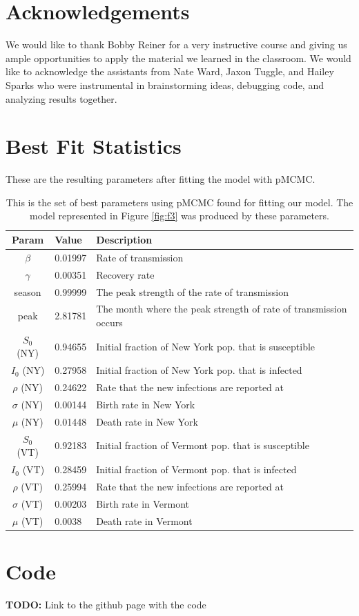 \documentclass[11pt]{amsart}
\begin{document}
\section*{Acknowledgements}
We would like to thank Bobby Reiner for a very instructive course and giving us ample opportunities to apply the material we learned in the classroom.
We would like to acknowledge the assistants from Nate Ward, Jaxon Tuggle, and Hailey Sparks who were instrumental in brainstorming ideas, debugging code, and analyzing results together.

\newpage
\appendix

\section{Best Fit Statistics}
These are the resulting parameters after fitting the model with pMCMC.
\begin{table}[h]
    \centering
    \begin{tabular}{|c|l|l|} %
        \hline
        \textbf{Param} & \textbf{Value} & \textbf{Description} \\ 
        \hline
        $\beta$ & 0.01997 & Rate of transmission \\
        \hline
        $\gamma$ & 0.00351 & Recovery rate \\
	\hline
        season & 0.99999 & The peak strength of the rate of transmission \\
        \hline
        peak & 2.81781 & The month where the peak strength of rate of transmission occurs \\
        \hline
        $S_0$ (NY) & 0.94655 & Initial fraction of New York pop. that is susceptible \\
        \hline
        $I_0$ (NY) & 0.27958 & Initial fraction of New York pop. that is infected \\
        \hline
        $\rho$ (NY) & 0.24622 & Rate that the new infections are reported at \\
        \hline
        $\sigma$ (NY) & 0.00144 & Birth rate in New York \\
        \hline
        $\mu$ (NY) & 0.01448 & Death rate in New York \\
        \hline
        $S_0$ (VT) & 0.92183 & Initial fraction of Vermont pop. that is susceptible \\
        \hline
        $I_0$ (VT) & 0.28459 & Initial fraction of Vermont pop. that is infected \\
        \hline
        $\rho$ (VT) & 0.25994 & Rate that the new infections are reported at \\
        \hline
        $\sigma$ (VT) & 0.00203 & Birth rate in Vermont \\
        \hline
        $\mu$ (VT) & 0.0038 & Death rate in Vermont \\
        \hline
    \end{tabular}
    \caption{This is the set of best parameters using pMCMC found for fitting our model.
    The model represented in Figure \ref{fig:f3} was produced by these parameters.}
    \label{tab:tab0}
\vspace*{-1mm}
\end{table}

\section{Code}
\textbf{TODO:} Link to the github page with the code
\end{document}
